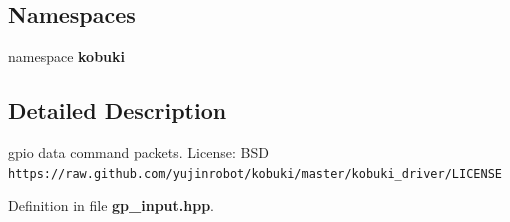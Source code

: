 \subsection*{\-Namespaces}
\begin{DoxyCompactItemize}
\item 
namespace {\bf kobuki}
\end{DoxyCompactItemize}


\subsection{\-Detailed \-Description}
gpio data command packets. \-License\-: \-B\-S\-D {\tt https\-://raw.\-github.\-com/yujinrobot/kobuki/master/kobuki\-\_\-driver/\-L\-I\-C\-E\-N\-S\-E} 

\-Definition in file {\bf gp\-\_\-input.\-hpp}.

